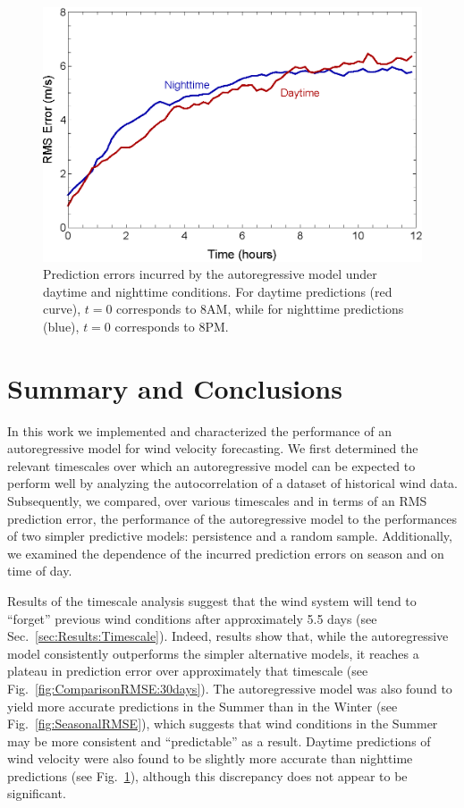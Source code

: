 \documentclass[11pt, oneside]{article}
\newcommand{\figref}[1]{Fig.~\ref{#1}}
\newcommand{\secref}[1]{Sec.~\ref{#1}}
\begin{document}
\begin{figure}[htb]
\centering
\includegraphics[width=0.7\columnwidth]{figures/DiurnalRMSPredictionError}
\caption{Prediction errors incurred by the autoregressive model under daytime and nighttime conditions.
For daytime predictions (red curve), $t = 0$ corresponds to 8AM, while for nighttime predictions (blue), $t = 0$ corresponds to 8PM.}
\label{fig:DiurnalRMSE}
\end{figure}

\section{Summary and Conclusions}\label{sec:Conclusions}
In this work we implemented and characterized the performance of an autoregressive model for wind velocity forecasting.
We first determined the relevant timescales over which an autoregressive model can be expected to perform well by analyzing the autocorrelation of a dataset of historical wind data.
Subsequently, we compared, over various timescales and in terms of an RMS prediction error, the performance of the autoregressive model to the performances of two simpler predictive models: persistence and a random sample.
Additionally, we examined the dependence of the incurred prediction errors on season and on time of day.

Results of the timescale analysis suggest that the wind system will tend to ``forget'' previous wind conditions after approximately 5.5 days (see \secref{sec:Results:Timescale}).
Indeed, results show that, while the autoregressive model consistently outperforms the simpler alternative models, it reaches a plateau in prediction error over approximately that timescale (see \figref{fig:ComparisonRMSE:30days}).
The autoregressive model was also found to yield more accurate predictions in the Summer than in the Winter (see \figref{fig:SeasonalRMSE}), which suggests that wind conditions in the Summer may be more consistent and ``predictable'' as a result.
Daytime predictions of wind velocity were also found to be slightly more accurate than nighttime predictions (see \figref{fig:DiurnalRMSE}), although this discrepancy does not appear to be significant.
\end{document}
